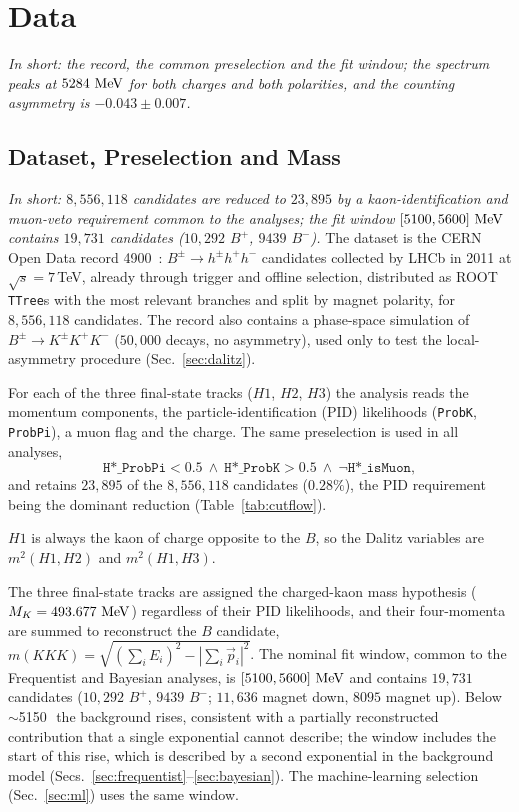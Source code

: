 \section{Data}
\label{sec:data}
\label{app:ext_data}

\emph{In short: the record, the common preselection and the fit window; the spectrum peaks at $5284\,\,\text{Me\hspace{-.08em}V}$ for both charges and both polarities, and the counting asymmetry is $-0.043\pm0.007$.}
\subsection{Dataset, Preselection and Mass}
\label{sec:data_presel}
\emph{In short: $8{,}556{,}118$ candidates are reduced to $23{,}895$ by a kaon-identification and muon-veto requirement common to the analyses; the fit window $[5100,5600]\,\,\text{Me\hspace{-.08em}V}$ contains $19{,}731$ candidates ($10{,}292$ $B^+$, $9439$ $B^-$).}
The dataset is the CERN Open Data record 4900~\cite{opendata_record}: $B^{\pm}\to h^{\pm}h^{+}h^{-}$ candidates collected by LHCb in 2011 at $\sqrt{s}=7$\,TeV, already through trigger and offline selection, distributed as ROOT \texttt{TTree}s with the most relevant branches and split by magnet polarity, for $8{,}556{,}118$ candidates. The record also contains a phase-space simulation of $B^{\pm}\to K^{\pm}K^{+}K^{-}$ ($50{,}000$ decays, no asymmetry), used only to test the local-asymmetry procedure (Sec.~\ref{sec:dalitz}).


For each of the three final-state tracks ($H1$, $H2$, $H3$) the analysis reads the momentum components, the particle-identification (PID) likelihoods (\texttt{ProbK}, \texttt{ProbPi}), a muon flag and the charge. The same preselection is used in all analyses,
\[
\texttt{H*\_ProbPi} < 0.5 \ \wedge\ \texttt{H*\_ProbK} > 0.5 \ \wedge\ \lnot\texttt{H*\_isMuon},
\]
and retains $23{,}895$ of the $8{,}556{,}118$ candidates ($0.28\%$), the PID requirement being the dominant reduction (Table~\ref{tab:cutflow}).

$H1$ is always the kaon of charge opposite to the $B$, so the Dalitz variables are $m^2(H1,H2)$ and $m^2(H1,H3)$.

\label{sec:data_mass}
The three final-state tracks are assigned the charged-kaon mass hypothesis ($M_K=493.677\,\,\text{Me\hspace{-.08em}V}$) regardless of their PID likelihoods, and their four-momenta are summed to reconstruct the $B$ candidate, $m(KKK)=\sqrt{(\sum_i E_i)^2-|\sum_i \vec{p}_i|^2}$. The nominal fit window, common to the Frequentist and Bayesian analyses, is $[5100,5600]\,\,\text{Me\hspace{-.08em}V}$ and contains $19{,}731$ candidates ($10{,}292$ $B^+$, $9439$ $B^-$; $11{,}636$ magnet down, $8095$ magnet up). Below $\sim$5150\,\MeV\ the background rises, consistent with a partially reconstructed contribution that a single exponential cannot describe; the window includes the start of this rise, which is described by a second exponential in the background model (Secs.~\ref{sec:frequentist}--\ref{sec:bayesian}). The machine-learning selection (Sec.~\ref{sec:ml}) uses the same window.

